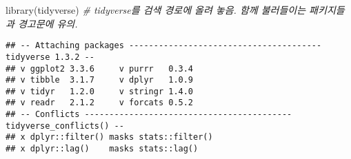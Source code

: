 \documentclass[
]{article}
\newenvironment{Shaded}{\begin{snugshade}}{\end{snugshade}}
\newcommand{\CommentTok}[1]{\textcolor[rgb]{0.56,0.35,0.01}{\textit{#1}}}
\newcommand{\FunctionTok}[1]{\textcolor[rgb]{0.00,0.00,0.00}{#1}}
\newcommand{\NormalTok}[1]{#1}
\begin{document}
\begin{Shaded}
\begin{Highlighting}[]
\FunctionTok{library}\NormalTok{(tidyverse) }\CommentTok{\# \textasciigrave{}tidyverse\textasciigrave{}를 검색 경로에 올려 놓음. 함께 불러들이는 패키지들과 경고문에 유의.}
\end{Highlighting}
\end{Shaded}

\begin{verbatim}
## -- Attaching packages --------------------------------------- tidyverse 1.3.2 --
## v ggplot2 3.3.6     v purrr   0.3.4
## v tibble  3.1.7     v dplyr   1.0.9
## v tidyr   1.2.0     v stringr 1.4.0
## v readr   2.1.2     v forcats 0.5.2
## -- Conflicts ------------------------------------------ tidyverse_conflicts() --
## x dplyr::filter() masks stats::filter()
## x dplyr::lag()    masks stats::lag()
\end{verbatim}
\end{document}
